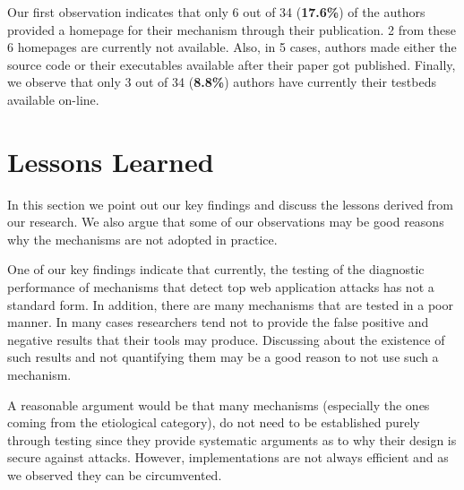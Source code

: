 \documentclass[conference]{IEEEtran}
\begin{document}
Our first observation indicates that only 6
out of 34 ({\bf 17.6\%}) of the authors provided a homepage for
their mechanism through their publication.
2 from these 6 homepages are currently not available.
Also, in 5 cases, authors made either the source code
or their executables available after their paper
got published. Finally, we observe that only 3
out of 34 ({\bf 8.8\%}) authors have currently
their testbeds available on-line.

\section{Lessons Learned}

In this section we point out our key findings and
discuss the lessons derived from our research.
We also argue that some of our observations may be
good reasons why the mechanisms are not adopted in practice.

One of our key findings indicate that currently,
the testing of the diagnostic performance of
mechanisms that detect top web application attacks
has not a standard form. In addition,
there are many mechanisms that are tested in a poor
manner. In many cases researchers tend not to
provide the false positive and negative results
that their tools may produce. Discussing
about the existence of such results and not
quantifying them may be a good reason to not use
such a mechanism.

A reasonable argument would be that many
mechanisms (especially the ones coming from the
etiological category), do not need to be established
purely through testing since they provide systematic
arguments as to why their design is secure against attacks.
However, implementations are not always efficient
and as we observed they can be circumvented.
\end{document}
